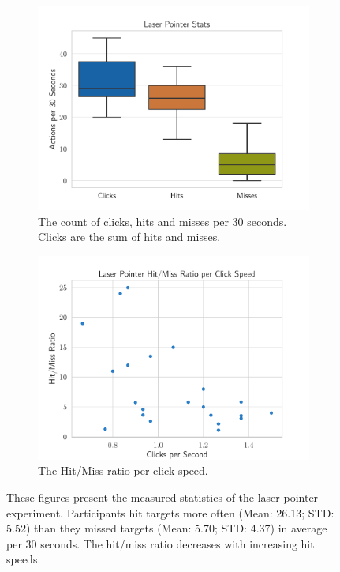 \begin{figure}[H]
	\centering
	\begin{subfigure}{.48\linewidth}%
		\centering
		\includegraphics[width=\linewidth]{figures/evaluation/eval_exp_lp.pdf}
		\caption{The count of clicks, hits and misses per 30 seconds. Clicks are the sum of hits and misses.}\label{fig:eval-exp-lp}
	\end{subfigure}%
	\hspace{0.02\linewidth}%
	\begin{subfigure}{.48\linewidth}%
		\centering
		\includegraphics[width=\linewidth]{figures/evaluation/eval_exp_lp_ratio_scatter.pdf}
		\caption{The Hit/Miss ratio per click speed.}\label{fig:eval-exp-lp-ratio-scatter} %
	\end{subfigure}%
	\caption[Laser pointer task results]{These figures present the measured statistics of the laser pointer experiment. Participants hit targets more often (Mean: 26.13; \gls{STD}: 5.52) than they missed targets (Mean: 5.70; \gls{STD}: 4.37) in average per 30 seconds. The hit/miss ratio decreases with increasing hit speeds.}\label{fig:exp-lp-eval}
\end{figure}


